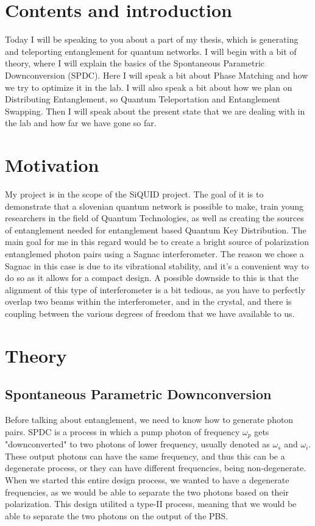 \documentclass{article}
\begin{document}
\section{Contents and introduction}
Today I will be speaking to you about a part of my thesis, which is generating and teleporting entanglement for quantum networks. I will begin with a bit of theory,
where I will explain the basics of the Spontaneous Parametric Downconversion (SPDC). Here I will speak a bit about Phase Matching and how we try to optimize it in the lab. I will also
speak a bit about how we plan on Distributing Entanglement, so Quantum Teleportation and Entanglement Swapping.
Then I will speak about the present state that we are dealing with in the lab and how far we have gone so far.

\section{Motivation}
My project is in the scope of the SiQUID project. The goal of it is to demonstrate that a slovenian quantum network is possible to make,
train young researchers in the field of Quantum Technologies, as well as creating the sources of entanglement needed for entanglement based Quantum Key Distribution.
The main goal for me in this regard would be to create a bright source of polarization entanglemed photon pairs using a Sagnac interferometer.
The reason we chose a Sagnac in this case is due to its vibrational stability, and it's a convenient way to do so as it allows for a compact design.
A possible downside to this is that the alignment of this type of interferometer is a bit tedious, as you have to perfectly overlap two beams within the interferometer,
and in the crystal, and there is coupling between the various degrees of freedom that we have available to us.

\section{Theory}
\subsection{Spontaneous Parametric Downconversion}
Before talking about entanglement, we need to know how to generate photon pairs.
SPDC is a process in which a pump photon of frequency $\omega_p$ gets "downconverted" to two photons of lower frequency,
usually denoted as $\omega_s$ and $\omega_i$. These output photons can have the same frequency,
and thus this can be a degenerate process, or they can have different frequencies, being non-degenerate.
When we started this entire design process, we wanted to have a degenerate frequencies, as we would be able to separate
the two photons based on their polarization. This design utilited a type-II process, meaning that we would be able 
to separate the two photons on the output of the PBS.
\end{document}
